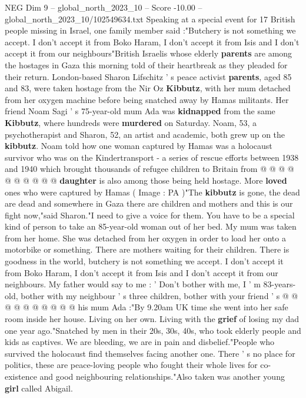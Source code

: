 \begin{textsample}{NEG Dim 9 – global\_north\_2023\_10 – Score -10.00 – global\_north\_2023\_10/102549634.txt}  \label{ex:f9_neg_033}
Speaking at a special event for 17 British people missing in Israel, one family member said :"Butchery is not something we accept.
I don't accept it from Boko Haram, I don't accept it from Isis and I don't accept it from our neighbours"British Israelis whose elderly \textbf{parents} are among the hostages in Gaza this morning told of their heartbreak as they pleaded for their return.
London-based Sharon Lifschitz ' s peace activist \textbf{parents}, aged 85 and 83, were taken hostage from the Nir Oz \textbf{Kibbutz}, with her mum detached from her oxygen machine before being snatched away by Hamas militants.
Her friend Noam Sagi ' s 75-year-old mum Ada was \textbf{kidnapped} from the same \textbf{Kibbutz}, where hundreds were \textbf{murdered} on Saturday.
Noam, 53, a psychotherapist and Sharon, 52, an artist and academic, both grew up on the \textbf{kibbutz}.
Noam told how one woman captured by Hamas was a holocaust survivor who was on the Kindertransport - a series of rescue efforts between 1938 and 1940 which brought thousands of refugee children to Britain from @ @ @ @ @ @ @ @ @ @ \textbf{daughter} is also among those being held hostage.
More \textbf{loved} ones who were captured by Hamas ( Image : PA )"The \textbf{kibbutz} is gone, the dead are dead and somewhere in Gaza there are children and mothers and this is our fight now,"said Sharon."I need to give a voice for them.
You have to be a special kind of person to take an 85-year-old woman out of her bed.
My mum was taken from her home.
She was detached from her oxygen in order to load her onto a motorbike or something.
There are mothers waiting for their children.
There is goodness in the world, butchery is not something we accept.
I don't accept it from Boko Haram, I don't accept it from Isis and I don't accept it from our neighbours.
My father would say to me : ' Don't bother with me, I ' m 83-years-old, bother with my neighbour ' s three children, bother with your friend ' s @ @ @ @ @ @ @ @ @ @ his mum Ada :"By 9.20am UK time she went into her safe room inside her house.
Living on her own.
Living with the \textbf{grief} of losing my dad one year ago."Snatched by men in their 20s, 30s, 40s, who took elderly people and kids as captives.
We are bleeding, we are in pain and disbelief."People who survived the holocaust find themselves facing another one.
There ' s no place for politics, these are peace-loving people who fought their whole lives for co-existence and good neighbouring relationships."Also taken was another young \textbf{girl} called Abigail.

\end{textsample}
